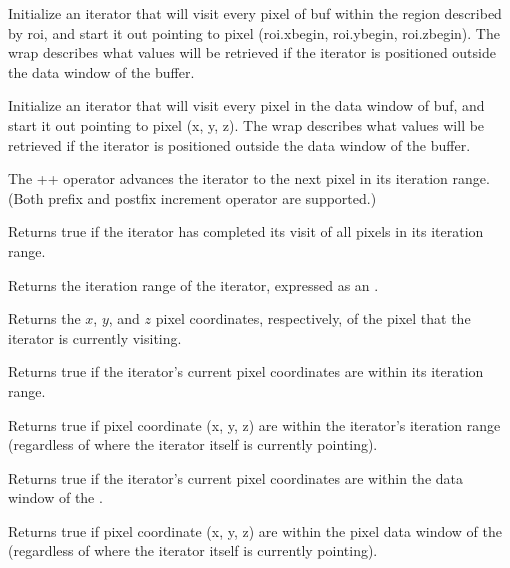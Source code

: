 Initialize an iterator that will visit every pixel of {\cf buf} 
within the region
described by {\cf roi}, and start it out pointing to pixel ({\cf roi.xbegin, roi.ybegin, roi.zbegin}).
The {\cf wrap} describes what values will be retrieved
if the iterator is positioned outside the data window of the buffer.
\apiend

Initialize an iterator that will visit every pixel in the data window
of {\cf buf}, and start it out pointing to pixel ({\cf x, y, z}).
The {\cf wrap} describes what values will be retrieved
if the iterator is positioned outside the data window of the buffer.
\apiend

The {\cf ++} operator advances the iterator to the next pixel in its
iteration range.  (Both prefix and postfix increment operator are
supported.)
\apiend

Returns {\cf true} if the iterator has completed its visit of all pixels
in its iteration range.
\apiend

Returns the iteration range of the iterator, expressed as an \ROI.
\apiend

Returns the $x$, $y$, and $z$ pixel coordinates, respectively, of the
pixel that the iterator is currently visiting.
\apiend

Returns {\cf true} if the iterator's current pixel coordinates 
are within its iteration range.
\apiend

Returns {\cf true} if pixel coordinate ({\cf x, y, z}) are within the
iterator's iteration range (regardless of where the iterator itself
is currently pointing).
\apiend

Returns {\cf true} if the iterator's current pixel coordinates 
are within the data window of the \ImageBuf.
\apiend

Returns {\cf true} if pixel coordinate ({\cf x, y, z}) are within the
pixel data window of the \ImageBuf (regardless of where the iterator itself
is currently pointing).
\apiend

